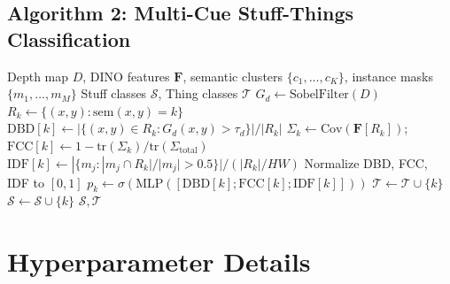 \documentclass{article}
\begin{document}
\subsection{Algorithm 2: Multi-Cue Stuff-Things Classification}

\begin{algorithm}[H]
\caption{Multi-Cue Stuff-Things Classifier (MC-STC)}
\label{alg:stc}
\begin{algorithmic}[1]
\REQUIRE Depth map $D$, DINO features $\mathbf{F}$, semantic clusters $\{c_1, \ldots, c_K\}$, instance masks $\{m_1, \ldots, m_M\}$
\ENSURE Stuff classes $\mathcal{S}$, Thing classes $\mathcal{T}$
\STATE $G_d \leftarrow \text{SobelFilter}(D)$ 
    \STATE $R_k \leftarrow \{(x,y) : \text{sem}(x,y) = k\}$
    \STATE $\text{DBD}[k] \leftarrow |\{(x,y) \in R_k : G_d(x,y) > \tau_d\}| / |R_k|$
    \STATE $\Sigma_k \leftarrow \text{Cov}(\mathbf{F}[R_k])$; \quad $\text{FCC}[k] \leftarrow 1 - \text{tr}(\Sigma_k) / \text{tr}(\Sigma_{\text{total}})$
    \STATE $\text{IDF}[k] \leftarrow |\{m_j : |m_j \cap R_k| / |m_j| > 0.5\}| / (|R_k| / HW)$
\ENDFOR
\STATE Normalize DBD, FCC, IDF to $[0, 1]$
    \STATE $p_k \leftarrow \sigma(\text{MLP}([\text{DBD}[k]; \text{FCC}[k]; \text{IDF}[k]]))$
        \STATE $\mathcal{T} \leftarrow \mathcal{T} \cup \{k\}$
    \ELSE
        \STATE $\mathcal{S} \leftarrow \mathcal{S} \cup \{k\}$
    \ENDIF
\ENDFOR
\RETURN $\mathcal{S}, \mathcal{T}$
\end{algorithmic}
\end{algorithm}


\section{Hyperparameter Details}
\label{sec:appendix_hyperparams}
\end{document}
